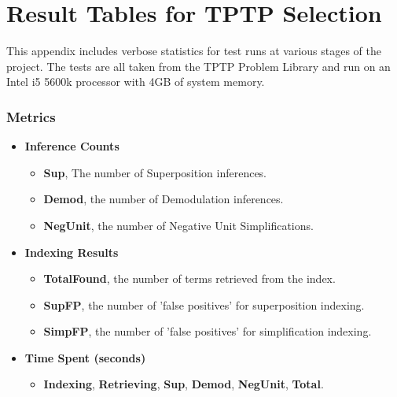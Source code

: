 
\appendix

\chapter{Result Tables for TPTP Selection}
\label{app:app1}

\vspace{-1cm}

This appendix includes verbose statistics for test runs at various stages of the
project. The tests are all taken from the TPTP Problem Library \cite{tptp} and run on an Intel i5 5600k processor with 4GB of system memory.

\subsection{Metrics}

\begin{itemize}
\item\textbf{Inference Counts}
\begin{itemize}
\item \textbf{Sup}, The number of Superposition inferences. 
\item \textbf{Demod}, the number of Demodulation inferences.
\item \textbf{NegUnit}, the number of Negative Unit Simplifications.
\end{itemize}
\item\textbf{Indexing Results}
\begin{itemize}
\item \textbf{TotalFound}, the number of terms retrieved from the index.
\item \textbf{SupFP}, the number of 'false positives' for superposition indexing.
\item \textbf{SimpFP}, the number of 'false positives' for simplification indexing.
\end{itemize}
\item\textbf{Time Spent (seconds)}
\begin{itemize}
\item \textbf{Indexing}, \textbf{Retrieving}, \textbf{Sup}, \textbf{Demod}, \textbf{NegUnit}, \textbf{Total}.
\end{itemize}
\end{itemize}

